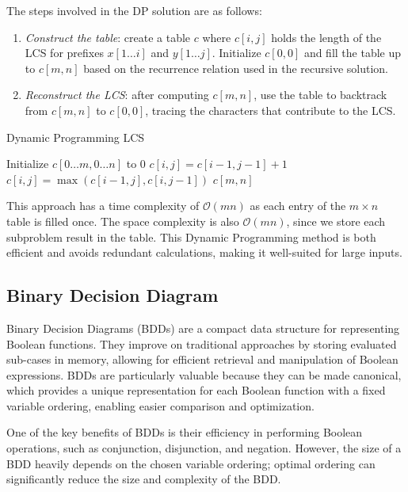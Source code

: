 The steps involved in the DP solution are as follows:
\begin{enumerate}
    \item \textit{Construct the table}: create a table $c$ where $c[i,j]$ holds the length of the LCS for prefixes $x[1\dots i]$ and $y[1\dots j]$. 
        Initialize $c[0,0]$ and fill the table up to $c[m,n]$ based on the recurrence relation used in the recursive solution.
    \item \textit{Reconstruct the LCS}: after computing $c[m,n]$, use the table to backtrack from $c[m,n]$ to $c[0,0]$, tracing the characters that contribute to the LCS.
\end{enumerate}
\begin{algorithm}[H] 
    \caption{Dynamic Programming LCS} 
    \begin{algorithmic} 
            \State Initialize $c[0\dots m,0\dots n]$ to 0 
                        \State $c[i, j] = c[i-1, j-1] + 1$ 
                    \Else 
                        \State $c[i, j] = \max(c[i-1, j], c[i, j-1])$ 
                    \EndIf 
                \EndFor 
            \EndFor 
            \State \Return $c[m, n]$ 
        \EndProcedure 
    \end{algorithmic} 
\end{algorithm}
This approach has a time complexity of $\mathcal{O}(mn)$ as each entry of the $m\times n$ table is filled once.
The space complexity is also $\mathcal{O}(mn)$, since we store each subproblem result in the table.
This Dynamic Programming method is both efficient and avoids redundant calculations, making it well-suited for large inputs.

\subsection{Binary Decision Diagram}
Binary Decision Diagrams (BDDs) are a compact data structure for representing Boolean functions.
They improve on traditional approaches by storing evaluated sub-cases in memory, allowing for efficient retrieval and manipulation of Boolean expressions. 
BDDs are particularly valuable because they can be made canonical, which provides a unique representation for each Boolean function with a fixed variable ordering, enabling easier comparison and optimization.

One of the key benefits of BDDs is their efficiency in performing Boolean operations, such as conjunction, disjunction, and negation. 
However, the size of a BDD heavily depends on the chosen variable ordering; optimal ordering can significantly reduce the size and complexity of the BDD.

